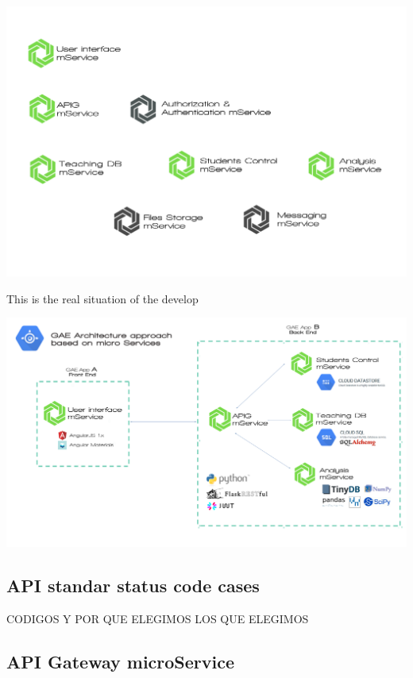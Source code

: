 \begin{center}
\includegraphics[scale=0.22]{img/graphics/final_microservices_distribution.png}
\end{center}

This is the real situation of the develop

\begin{center}
\includegraphics[scale=0.15]{img/graphics/GAE_final_architecture.png}
\end{center}

\subsection{API standar status code cases}

CODIGOS Y POR QUE ELEGIMOS LOS QUE ELEGIMOS

\subsection{API Gateway microService}

